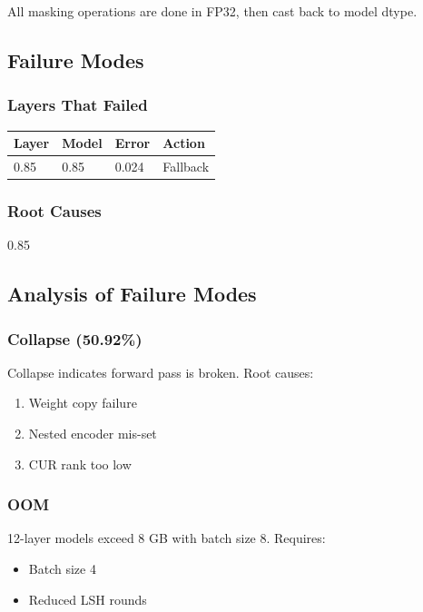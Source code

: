 All masking operations are done in FP32, then cast back to model dtype.

\subsection{Failure Modes}

\subsubsection{Layers That Failed}

\begin{table}[H]
\centering
\small
\begin{tabular}{llll}
\toprule
\textbf{Layer} & \textbf{Model} & \textbf{Error} & \textbf{Action} \\
\midrule
0.85 & 0.85 & 0.024 & Fallback \\
\bottomrule
\end{tabular}
\end{table}

\subsubsection{Root Causes}

0.85

\subsection{Analysis of Failure Modes}

\subsubsection{Collapse (50.92\%)}

Collapse indicates forward pass is broken. Root causes:
\begin{enumerate}
\item Weight copy failure
\item Nested encoder mis-set
\item CUR rank too low

\end{enumerate}
\subsubsection{OOM}

12-layer models exceed 8 GB with batch size 8. Requires:
\begin{itemize}
\item Batch size 4
\item Reduced LSH rounds

\end{itemize}
